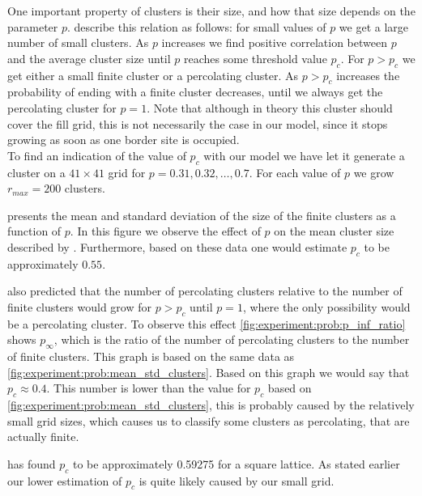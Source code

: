 One important property of clusters is their size, and how that size depends on the parameter $p$. \textcite{kenzel1997physics} describe this relation as follows: for small values of $p$ we get a large number of small clusters. As $p$ increases we find positive correlation between $p$ and the average cluster size until $p$ reaches some threshold value $p_c$. For $p > p_c$ we get either a small finite cluster or a percolating cluster. As $p > p_c$ increases the probability of ending with a finite cluster decreases, until we always get the percolating cluster for $p =1 $. Note that although in theory this cluster should cover the fill grid, this is not necessarily the case in our model, since it stops growing as soon as one border site is occupied. \\

To find an indication of the value of $p_c$ with our model we have let it generate a cluster on a $41 \times 41$ grid for $p = 0.31, 0.32, \dotsc, 0.7$. For each value of $p$ we grow $r_{max} = 200$ clusters. 

 presents the mean and standard deviation of the size of the finite clusters as a function of $p$. In this figure we observe the effect of $p$ on the mean cluster size described by \citeauthor{kenzel1997physics}. Furthermore, based on these data one would estimate $p_c$ to be approximately $0.55$. 

\citeauthor{kenzel1997physics} also predicted that the number of percolating clusters relative to the number of finite clusters would grow for $p > p_c$ until $p = 1$, where the only possibility would be a percolating cluster. To observe this effect \cref{fig:experiment:prob:p_inf_ratio} shows $p_\infty$, which is the ratio of the number of percolating clusters to the number of finite clusters. This graph is based on the same data as \cref{fig:experiment:prob:mean_std_clusters}. Based on this graph we would say that $p_c \approx \num{0.4}$. This number is lower than the value for $p_c$ based on \cref{fig:experiment:prob:mean_std_clusters}, this is probably caused by the relatively small grid sizes, which causes us to classify some clusters as percolating, that are actually finite. 

\textcite{stauffer1994introduction} has found $p_c$ to be approximately \num{0.59275} for a square lattice. As stated earlier our lower estimation of $p_c$ is quite likely caused by our small grid. 
